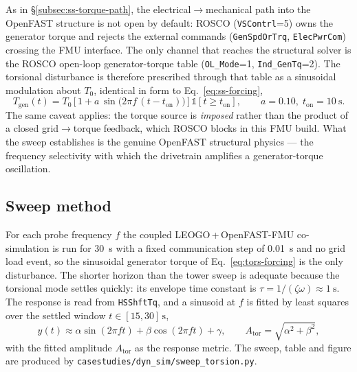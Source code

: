 As in \S\ref{subsec:ss-torque-path}, the electrical\(\to\)mechanical path into
the OpenFAST structure is not open by default: ROSCO (\texttt{VSContrl}=5) owns
the generator torque and rejects the external commands (\texttt{GenSpdOrTrq},
\texttt{ElecPwrCom}) crossing the FMU interface. The only channel that reaches
the structural solver is the ROSCO open-loop generator-torque table
(\texttt{OL\_Mode}=1, \texttt{Ind\_GenTq}=2). The torsional disturbance is
therefore prescribed through that table as a sinusoidal modulation about
\(T_0\), identical in form to Eq.~\eqref{eq:ss-forcing},
\begin{equation}
  T_{\mathrm{gen}}(t) = T_0\,\big[\,1 + a\,
    \sin\!\big(2\pi f\,(t-t_{\mathrm{on}})\big)\,\big]\,
    \mathbb{1}[t \ge t_{\mathrm{on}}],
  \qquad a = 0.10,\; t_{\mathrm{on}}=\SI{10}{\second}.
  \label{eq:tors-forcing}
\end{equation}
The same caveat applies: the torque source is \emph{imposed} rather than the
product of a closed grid\(\to\)torque feedback, which ROSCO blocks in this FMU
build. What the sweep establishes is the genuine OpenFAST structural physics ---
the frequency selectivity with which the drivetrain amplifies a generator-torque
oscillation.

\subsection{Sweep method}
\label{subsec:tors-method}

For each probe frequency \(f\) the coupled LEOGO\,+\,OpenFAST-FMU co-simulation
is run for \SI{30}{\second} with a fixed communication step of
\SI{0.01}{\second} and no grid load event, so the sinusoidal generator torque of
Eq.~\eqref{eq:tors-forcing} is the only disturbance. The shorter horizon than
the tower sweep is adequate because the torsional mode settles quickly: its
envelope time constant is \(\tau = 1/(\zeta\omega)\approx\SI{1}{\second}\). The
response is read from \texttt{HSShftTq}, and a sinusoid at \(f\) is fitted by
least squares over the settled window \(t\in[15,30]\,\si{\second}\),
\begin{equation}
  y(t) \approx \alpha\sin(2\pi f t) + \beta\cos(2\pi f t) + \gamma,
  \qquad
  A_{\mathrm{tor}} = \sqrt{\alpha^2 + \beta^2},
  \label{eq:tors-fit}
\end{equation}
with the fitted amplitude \(A_{\mathrm{tor}}\) as the response metric. The
sweep, table and figure are produced by
\texttt{casestudies/dyn\_sim/sweep\_torsion.py}.

